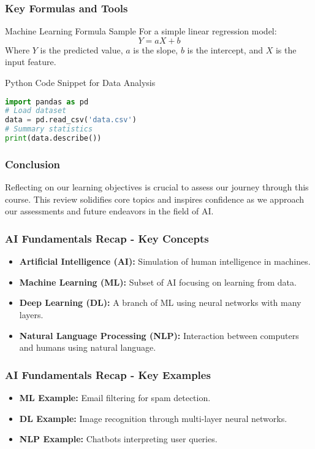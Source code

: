 \documentclass{beamer}
\begin{document}
\begin{frame}[fragile]
    \frametitle{Key Formulas and Tools}
    \begin{block}{Machine Learning Formula Sample}
        For a simple linear regression model:
        \begin{equation}
            Y = aX + b
        \end{equation}
        Where \( Y \) is the predicted value, \( a \) is the slope, \( b \) is the intercept, and \( X \) is the input feature.
    \end{block}
    \begin{block}{Python Code Snippet for Data Analysis}
        \begin{lstlisting}[language=Python]
import pandas as pd
# Load dataset
data = pd.read_csv('data.csv')
# Summary statistics
print(data.describe())
        \end{lstlisting}
    \end{block}
\end{frame}

\begin{frame}[fragile]
    \frametitle{Conclusion}
    Reflecting on our learning objectives is crucial to assess our journey through this course. This review solidifies core topics and inspires confidence as we approach our assessments and future endeavors in the field of AI.
\end{frame}

\begin{frame}[fragile]
    \frametitle{AI Fundamentals Recap - Key Concepts}
    \begin{itemize}
        \item \textbf{Artificial Intelligence (AI):} Simulation of human intelligence in machines.
        \item \textbf{Machine Learning (ML):} Subset of AI focusing on learning from data.
        \item \textbf{Deep Learning (DL):} A branch of ML using neural networks with many layers.
        \item \textbf{Natural Language Processing (NLP):} Interaction between computers and humans using natural language.
    \end{itemize}
\end{frame}

\begin{frame}[fragile]
    \frametitle{AI Fundamentals Recap - Key Examples}
    \begin{itemize}
        \item \textbf{ML Example:} Email filtering for spam detection.
        \item \textbf{DL Example:} Image recognition through multi-layer neural networks.
        \item \textbf{NLP Example:} Chatbots interpreting user queries.
    \end{itemize}
\end{frame}
\end{document}
